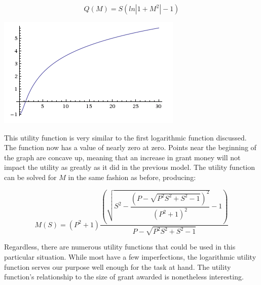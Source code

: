\documentclass[paper.tex]{subfiles}
\begin{document}
 	$$ Q(M) = S(ln|1+M^2| - 1) $$
 	
 	\begin{center}
 		\includegraphics[width=0.5\linewidth]{images/UF3}
 	\end{center}
 	
 	This utility function is very similar to the first logarithmic function discussed. The function now has a value of nearly zero at zero. Points near the beginning of the graph are concave up, meaning that an increase in grant money will not impact the utility as greatly as it did in the previous model. The utility function can be solved for $M$ in the same fashion as before, producing:
 	
 	$$ M(S) = (P^2+1) \dfrac{\left(\sqrt{S^2 - \dfrac{(P - \sqrt{P^2S^2 + S^2 - 1})^2}{(P^2 + 1)^2}} -1\right)}{P - \sqrt{P^2S^2 + S^2 - 1}}$$
	
	Regardless, there are numerous utility functions that could be used in this particular situation. While most have a few imperfections, the logarithmic utility function serves our purpose well enough for the task at hand. The utility function's relationship to the size of grant awarded is nonetheless interesting.
\end{document}
